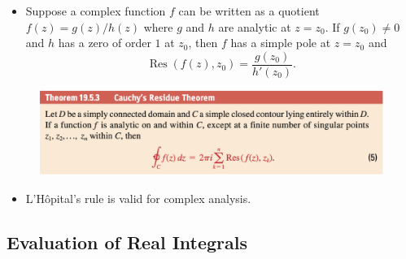 \documentclass{article}
\newcommand{\Res}{\operatorname{Res}}
\begin{document}
\begin{itemize}
\item Suppose a complex function $f$ can be written as a quotient $f(z) = g(z) / h(z)$ where $g$ and $h$ are analytic at $z = z_0$. If $g(z_0) \ne 0$ and $h$ has a zero of order $1$ at $z_0$, then $f$ has a simple pole at $z = z_0$ and \[\Res(f(z), z_0) = \frac{g(z_0)}{h'(z_0)}.\]
\end{itemize}

\begin{figure}[H]
  \centering
  \includegraphics[width=\textwidth]{cauchys-residue-theorem}
\end{figure}

\begin{itemize}
  \item L'Hôpital's rule is valid for complex analysis.
\end{itemize}

\subsection{Evaluation of Real Integrals}
\end{document}
